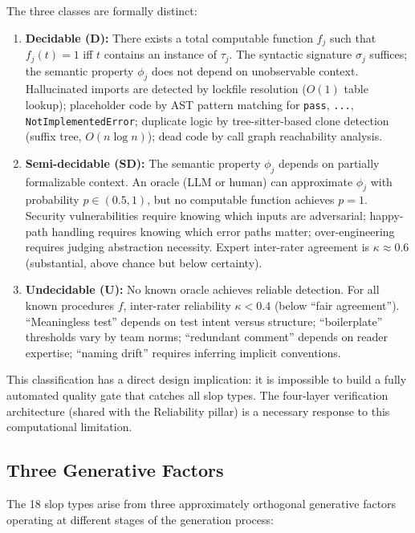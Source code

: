 The three classes are formally distinct:

\begin{enumerate}
    \item \textbf{Decidable (D):} There exists a total computable function $f_j$ such that $f_j(t) = 1$ iff $t$ contains an instance of $\tau_j$. The syntactic signature $\sigma_j$ suffices; the semantic property $\phi_j$ does not depend on unobservable context. Hallucinated imports are detected by lockfile resolution ($O(1)$ table lookup); placeholder code by AST pattern matching for \texttt{pass}, \texttt{...}, \texttt{NotImplementedError}; duplicate logic by tree-sitter-based clone detection (suffix tree, $O(n \log n)$); dead code by call graph reachability analysis.

    \item \textbf{Semi-decidable (SD):} The semantic property $\phi_j$ depends on partially formalizable context. An oracle (LLM or human) can approximate $\phi_j$ with probability $p \in (0.5, 1)$, but no computable function achieves $p = 1$. Security vulnerabilities require knowing which inputs are adversarial; happy-path handling requires knowing which error paths matter; over-engineering requires judging abstraction necessity. Expert inter-rater agreement is $\kappa \approx 0.6$ (substantial, above chance but below certainty).

    \item \textbf{Undecidable (U):} No known oracle achieves reliable detection. For all known procedures $f$, inter-rater reliability $\kappa < 0.4$ (below ``fair agreement''). ``Meaningless test'' depends on test intent versus structure; ``boilerplate'' thresholds vary by team norms; ``redundant comment'' depends on reader expertise; ``naming drift'' requires inferring implicit conventions.
\end{enumerate}

This classification has a direct design implication: it is impossible to build a fully automated quality gate that catches all slop types. The four-layer verification architecture (shared with the Reliability pillar) is a necessary response to this computational limitation.

\subsection{Three Generative Factors}

The 18 slop types arise from three approximately orthogonal generative factors operating at different stages of the generation process:


